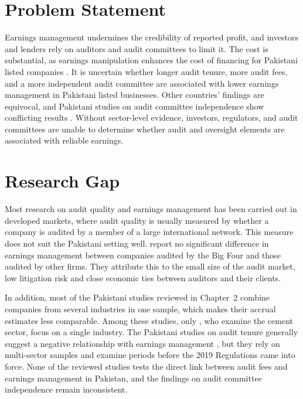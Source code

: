 \section{Problem Statement}

Earnings management undermines the credibility of reported profit, and investors and lenders rely on auditors and audit committees to limit it. The cost is substantial, as earnings manipulation enhances the cost of financing for Pakistani listed companies \parencite{ilyas2019}. It is uncertain whether longer audit tenure, more audit fees, and a more independent audit committee are associated with lower earnings management in Pakistani listed businesses. Other countries' findings are equivocal, and Pakistani studies on audit committee independence show conflicting results \parencite{latif2015,mumtaz2018}. Without sector-level evidence, investors, regulators, and audit committees are unable to determine whether audit and oversight elements are associated with reliable earnings.

\section{Research Gap}

Most research on audit quality and earnings management has been carried out in developed markets, where audit quality is usually measured by whether a company is audited by a member of a large international network. This measure does not suit the Pakistani setting well. \textcite{abid2018} report no significant difference in earnings management between companies audited by the Big Four and those audited by other firms. They attribute this to the small size of the audit market, low litigation risk and close economic ties between auditors and their clients.

In addition, most of the Pakistani studies reviewed in Chapter~2 combine companies from several industries in one sample, which makes their accrual estimates less comparable. Among these studies, only \textcite{alam2023}, who examine the cement sector, focus on a single industry. The Pakistani studies on audit tenure generally suggest a negative relationship with earnings management \parencite{kalabeke2019}, but they rely on multi-sector samples and examine periods before the 2019 Regulations came into force. None of the reviewed studies tests the direct link between audit fees and earnings management in Pakistan, and the findings on audit committee independence remain inconsistent.

